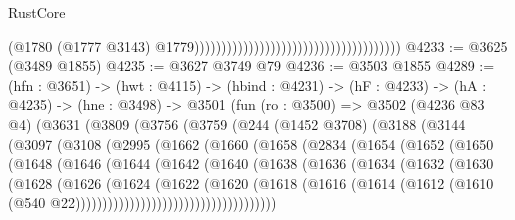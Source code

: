 \begin{lexlean}{RustCore}
\begin{coremodule}
                                                                              (@1780
                                                                                (@1777 @3143)
                                                                                @1779))))))))))))))))))))))))))))))))))))))
@4233 := @3625 (@3489 @1855)
@4235 := @3627 @3749 @79
@4236 := @3503 @1855
@4289 := (hfn : @3651) ->
  (hwt : @4115) ->
  (hbind : @4231) ->
  (hF : @4233) ->
  (hA : @4235) ->
  (hne : @3498) ->
  @3501
    (fun (ro : @3500) =>
    @3502
      (@4236 @83 @4)
      (@3631
        (@3809
          (@3756
            (@3759
              (@244
                (@1452 @3708)
                (@3188
                  (@3144
                    (@3097
                      (@3108
                        (@2995
                          (@1662
                            (@1660
                              (@1658
                                (@2834
                                  (@1654
                                    (@1652
                                      (@1650
                                        (@1648
                                          (@1646
                                            (@1644
                                              (@1642
                                                (@1640
                                                  (@1638
                                                    (@1636
                                                      (@1634
                                                        (@1632
                                                          (@1630
                                                            (@1628
                                                              (@1626
                                                                (@1624
                                                                  (@1622
                                                                    (@1620
                                                                      (@1618
                                                                        (@1616
                                                                          (@1614
                                                                            (@1612
                                                                              (@1610
                                                                                (@540
                                                                                  @22)))))))))))))))))))))))))))))))))))))

\end{coremodule}
\end{lexlean}
